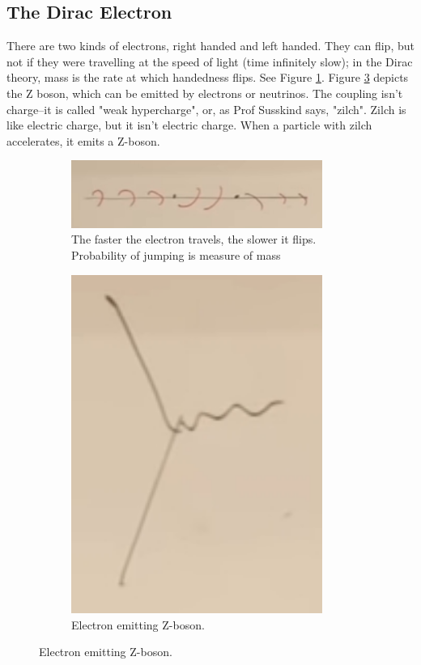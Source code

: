 \documentclass[]{article}
\begin{document}
\begin{appendices}
	\subsection{The Dirac Electron}
	
	There are two kinds of electrons, right handed and left handed. They can flip, but not if they were travelling at the speed of light (time infinitely slow); in the Dirac theory, mass is the rate at which handedness flips. See Figure \ref{fig:2-a3-flipping-electron}. Figure \ref{fig:2-a3-Z-boson} depicts the Z boson, which can be emitted by electrons or neutrinos. The coupling isn't charge--it is called "weak hypercharge", or, as Prof Susskind says, "zilch". Zilch is like electric charge, but it isn't electric charge. When a particle with zilch accelerates, it emits a Z-boson.
	
	\begin{figure}[H]
	\caption{Electron flipping between left and right}
		\begin{subfigure}[t]{0.65\textwidth}
			\caption{The faster the electron travels, the slower it flips. Probability of jumping is measure of mass}\label{fig:2-a3-flipping-electron}
			\includegraphics[width=0.9\textwidth]{2-a3-flipping-electron}
		\end{subfigure}
		\begin{subfigure}[t]{0.3\textwidth}
			\caption{Electron emitting Z-boson. }\label{fig:2-a3-Z-boson}
			\includegraphics[width=0.9\textwidth]{2-a3-Z-boson}

\end{subfigure}
\end{figure}
\end{appendices}
\end{document}
